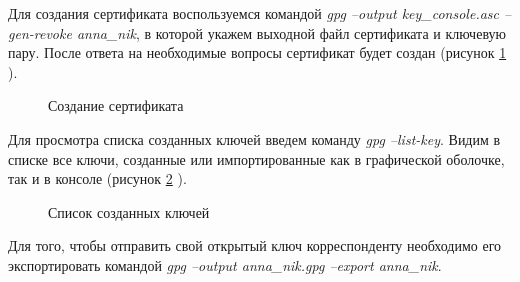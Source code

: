 \documentclass[10pt,a4paper]{report}
\begin{document}
Для создания сертификата воспользуемся командой \textit{gpg --output key\_console.asc  --gen-revoke anna\_nik}, в которой укажем выходной файл сертификата и ключевую пару. После ответа на необходимые вопросы сертификат будет создан (рисунок \ref{ris:image17} ). 
\begin{figure}[h]	
\caption{Создание сертификата}
\label{ris:image17}
\end{figure}

Для просмотра списка созданных ключей введем команду \textit{gpg --list-key}. Видим в списке все ключи, созданные или импортированные как в графической оболочке, так и в консоле (рисунок \ref{ris:image18} ).
\begin{figure}[h]
\caption{Список созданных ключей}
\label{ris:image18}
\end{figure}

Для того, чтобы отправить свой открытый ключ корреспонденту необходимо его экспортировать командой  \textit{gpg --output anna\_nik.gpg --export anna\_nik}.  
\end{document}

